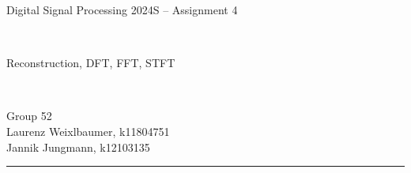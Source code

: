 \documentclass[12pt,a4paper,english]{article}
\begin{document}
\pagestyle{plain}

\thispagestyle{empty}
\noindent
\begin{minipage}[b][4cm]{1.0\textwidth}
    \begin{center}
        \begin{bf}
            \begin{large}
                Digital Signal Processing 2024S -- Assignment 4
            \end{large} \\
            \vspace{0.3cm}
            \begin{Large}
                Reconstruction, DFT, FFT, STFT
            \end{Large} \\
            \vspace{0.3cm}
        \end{bf}
        \begin{large}
            Group 52\\
            Laurenz Weixlbaumer, k11804751\\
            Jannik Jungmann, k12103135\\
        \end{large}
    \end{center}
\end{minipage}

\noindent \rule[0.8em]{\textwidth}{0.12mm}\\[-0.5em]
\end{document}
